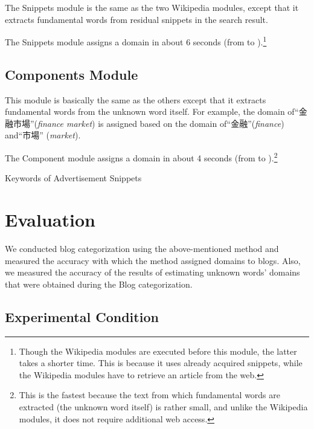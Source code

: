 \documentclass[english]{jnlp_1.4_rep}
\newcommand{\BAngou}[1]{}
\begin{document}
The Snippets module is the same as the two Wikipedia modules,
except that it extracts fundamental words from residual snippets in the
search result.

The Snippets module assigns a domain in about 6 seconds (from \BAngou{1}
to \BAngou{5}).\footnote{Though the Wikipedia modules are executed before
this module, the latter takes a shorter time. This is because it uses already
acquired snippets, while the Wikipedia modules have to retrieve an
article from the web.}


\subsection{Components Module}
\label{components}

This module is basically the same as the others except that it extracts
fundamental words from the unknown word itself.
For example, the domain of“金融市場”(\textit{finance market}) is
assigned based on the domain of“金融”(\textit{finance}) and“市場”
(\textit{market}). 

The Component module assigns a domain in about 4 seconds
 (from \BAngou{1} to
\BAngou{6}).\footnote{
This is the fastest because the text 
from which fundamental words are extracted (the unknown word itself) is
 rather small, and unlike the Wikipedia modules, it does not require
 additional web access.}

\begin{table}[t]
\caption{Keywords of Advertisement Snippets}
\label{corporate-words}

\end{table}

\section{Evaluation}
\label{sec:evaluation}

We conducted blog categorization using the above-mentioned method
and measured the accuracy with which the method assigned domains to
blogs. 
Also, we measured the accuracy of the results of estimating unknown
words' domains that were obtained during the Blog categorization.


\subsection{Experimental Condition}
\end{document}
